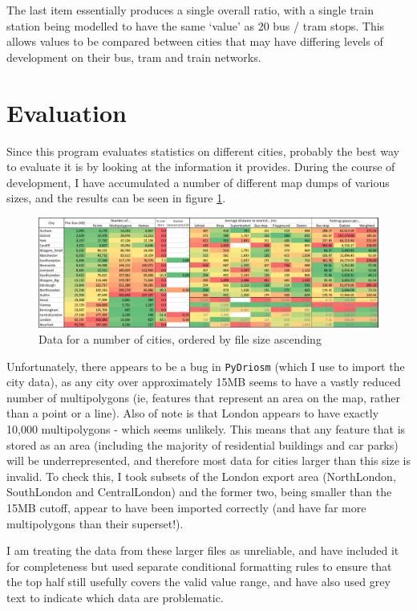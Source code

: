 \documentclass[12pt]{article} %
\begin{document}
The last item essentially produces a single overall ratio, with a single train station being modelled to have the same `value' as 20 bus / tram stops. This allows values to be compared between cities that may have differing levels of development on their bus, tram and train networks.


\section{Evaluation}
Since this program evaluates statistics on different cities, probably the best way to evaluate it is by looking at the information it provides. During the course of development, I have accumulated a number of different map dumps of various sizes, and the results can be seen in figure \ref{Fig:1}.

\begin{figure}
	\includegraphics[width=\textwidth]{data.png}
	\caption{Data for a number of cities, ordered by file size ascending}
	\label{Fig:1}
\end{figure}

Unfortunately, there appears to be a bug in \texttt{PyDriosm} (which I use to import the city data), as any city over approximately 15MB seems to have a vastly reduced number of multipolygons (ie, features that represent an area on the map, rather than a point or a line). Also of note is that London appears to have exactly 10,000 multipolygons - which seems unlikely. This means that any feature that is stored as an area (including the majority of residential buildings and car parks) will be underrepresented, and therefore most data for cities larger than this size is invalid. To check this, I took subsets of the London export area (NorthLondon, SouthLondon and CentralLondon) and the former two, being smaller than the 15MB cutoff, appear to have been imported correctly (and have far more multipolygons than their superset!).

I am treating the data from these larger files as unreliable, and have included it for completeness but used separate conditional formatting rules to ensure that the top half still usefully covers the valid value range, and have also used grey text to indicate which data are problematic.
\end{document}
